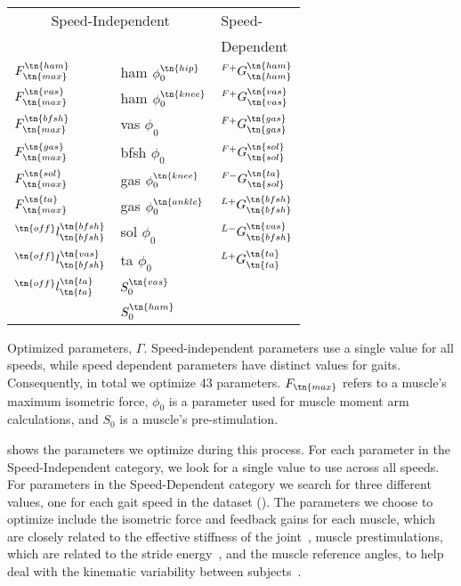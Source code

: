 \begin{margintable}[1in]    
    \centering
    \small
    \begin{tabular}{ll|l}
        \multicolumn{2}{c|}{Speed-Independent} & Speed- \\
                                         &     & Dependent \\
        \midrule
        $F_\tn{max}^\tn{ham}$            & ham $\phi_0^\tn{hip}$   & $^{F+}G_\tn{ham}^\tn{ham}$   \\
        $F_\tn{max}^\tn{vas}$            & ham $\phi_0^\tn{knee}$  & $^{F+}G_\tn{vas}^\tn{vas}$   \\
        $F_\tn{max}^\tn{bfsh}$           & vas $\phi_0$            & $^{F+}G_\tn{gas}^\tn{gas}$   \\
        $F_\tn{max}^\tn{gas}$            & bfsh $\phi_0$           & $^{F+}G_\tn{sol}^\tn{sol}$   \\
        $F_\tn{max}^\tn{sol}$            & gas $\phi_0^\tn{knee}$  & $^{F-}G_\tn{sol}^\tn{ta}$    \\
        $F_\tn{max}^\tn{ta}$             & gas $\phi_0^\tn{ankle}$ & $^{L+}G_\tn{bfsh}^\tn{bfsh}$ \\
        $^\tn{off}l_\tn{bfsh}^\tn{bfsh}$ & sol $\phi_0$            & $^{L-}G_\tn{bfsh}^\tn{vas}$  \\
        $^\tn{off}l_\tn{bfsh}^\tn{vas}$  & ta  $\phi_0$            & $^{L+}G_\tn{ta}^\tn{ta}$     \\
        $^\tn{off}l_\tn{ta}^\tn{ta}$     & $S_0^\tn{vas}$          & \\
                                         & $S_0^\tn{ham}$          & \\
    \end{tabular}
    \caption[Parameters optimized to generate parameter sets for dueling bandits
    optimization]{Optimized parameters, $\Gamma$. Speed-independent parameters
    use a single value for all speeds, while speed dependent parameters have
    distinct values for  gaits. Consequently,
    in total we optimize 43 parameters. $F_\tn{max}$ refers to a muscle's maximum
    isometric force, $\phi_0$ is a parameter used for muscle moment arm
    calculations, and $S_0$ is a muscle's pre-stimulation.}\label{tab:params}
\end{margintable}
 shows the parameters we optimize during this process.  For
each parameter in the Speed-Independent category, we look for a single value to
use across all speeds. For parameters in the Speed-Dependent category we search
for three different values, one for each gait speed in the dataset
(). The parameters we choose to optimize
include the isometric force and feedback gains for each muscle, which are
closely related to the effective stiffness of the
joint~\citep{geyer2003positive}, muscle prestimulations, which are related to
the stride energy~\citep{geyer2003positive}, and the muscle reference angles, to
help deal with the kinematic variability between
subjects~\citep{geyer2010muscle}.

